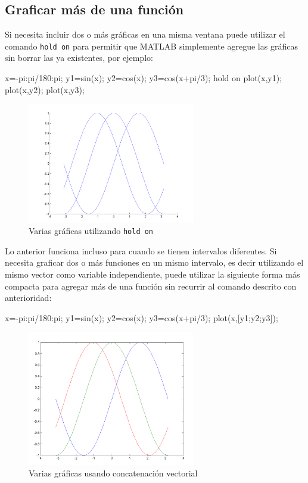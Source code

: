 \subsection{Graficar más de una función}

Si necesita incluir dos o más gráficas en una misma ventana puede
utilizar el comando \texttt{hold\ on} para permitir que MATLAB
simplemente agregue las gráficas sin borrar las ya existentes, por
ejemplo:

\begin{matlab}
x=-pi:pi/180:pi;
y1=sin(x);
y2=cos(x);
y3=cos(x+pi/3);
hold on
plot(x,y1);
plot(x,y2);
plot(x,y3);
\end{matlab}

\begin{figure}[htbp]
    \centering
    \includegraphics[width=0.65\textwidth]{src/img/ch4/img_4_2.png}
    \caption{Varias gráficas utilizando \texttt{hold on}}
    \label{fig:img_4_2}
\end{figure}

Lo anterior funciona incluso para cuando se tienen intervalos
diferentes. Si necesita graficar dos o más funciones en un mismo
intervalo, es decir utilizando el mismo vector como variable
independiente, puede utilizar la siguiente forma más compacta para
agregar más de una función sin recurrir al comando descrito con
anterioridad:

\begin{matlab}
x=-pi:pi/180:pi;
y1=sin(x);
y2=cos(x);
y3=cos(x+pi/3);
plot(x,[y1;y2;y3]);
\end{matlab}

\begin{figure}[htbp]
    \centering
    \includegraphics[width=0.65\textwidth]{src/img/ch4/img_4_3.png}
    \caption{Varias gráficas usando concatenación vectorial}
    \label{fig:img_4_3}
\end{figure}

